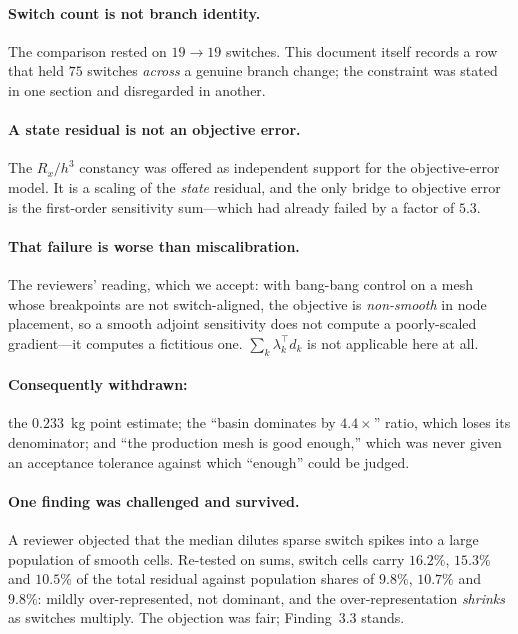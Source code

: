\documentclass[11pt]{article}
\begin{document}
\paragraph{Switch count is not branch identity.} The comparison rested on
$19\to19$ switches. This document itself records a row that held $75$ switches
\emph{across} a genuine branch change; the constraint was stated in one section
and disregarded in another.

\paragraph{A state residual is not an objective error.} The $R_x/h^3$
constancy was offered as independent support for the objective-error model. It
is a scaling of the \emph{state} residual, and the only bridge to objective
error is the first-order sensitivity sum---which had already failed by a factor
of $5.3$.

\paragraph{That failure is worse than miscalibration.} The reviewers' reading,
which we accept: with bang-bang control on a mesh whose breakpoints are not
switch-aligned, the objective is \emph{non-smooth} in node placement, so a
smooth adjoint sensitivity does not compute a poorly-scaled gradient---it
computes a fictitious one. $\sum_k\lambda_k^{\!\top}d_k$ is not applicable here
at all.

\paragraph{Consequently withdrawn:} the $0.233$~kg point estimate; the
``basin dominates by $4.4\times$'' ratio, which loses its denominator; and
``the production mesh is good enough,'' which was never given an acceptance
tolerance against which ``enough'' could be judged.

\paragraph{One finding was challenged and survived.} A reviewer objected that
the median dilutes sparse switch spikes into a large population of smooth
cells. Re-tested on sums, switch cells carry $16.2\%$, $15.3\%$ and $10.5\%$ of
the total residual against population shares of $9.8\%$, $10.7\%$ and $9.8\%$:
mildly over-represented, not dominant, and the over-representation \emph{shrinks}
as switches multiply. The objection was fair; Finding~3.3 stands.
\end{document}
